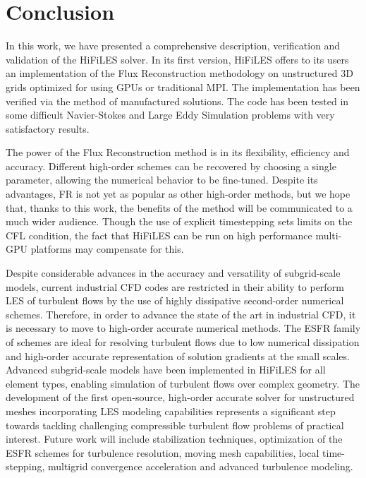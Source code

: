 
\section{Conclusion}
\label{sec:conclusion}

In this work, we have presented a comprehensive description, verification and validation of the HiFiLES solver. In its first version, HiFiLES offers to its users an implementation of the Flux Reconstruction methodology on unstructured 3D grids optimized for using GPUs or traditional MPI. The implementation has been verified via the method of manufactured solutions. The code has been tested in some difficult Navier-Stokes and Large Eddy Simulation problems with very satisfactory results.

The power of the Flux Reconstruction method is in its flexibility, efficiency and accuracy.
Different high-order schemes can be recovered by choosing a single parameter, allowing the numerical behavior to be fine-tuned.
Despite its advantages, FR is not yet as popular as other high-order methods, but we hope that, thanks to this work, the benefits of the method will be communicated to a much wider audience.
Though the use of explicit timestepping sets limits on the CFL condition, the fact that HiFiLES can be run on high performance multi-GPU platforms may compensate for this.


Despite considerable advances in the accuracy and versatility of subgrid-scale models, current industrial CFD codes are restricted in their ability to perform LES of turbulent flows by the use of highly dissipative second-order numerical schemes.
Therefore, in order to advance the state of the art in industrial CFD, it is necessary to move to high-order accurate numerical methods.
The ESFR family of schemes are ideal for resolving turbulent flows due to low numerical dissipation and high-order accurate representation of solution gradients at the small scales.
Advanced subgrid-scale models have been implemented in HiFiLES for all element types, enabling simulation of turbulent flows over complex geometry.
The development of the first open-source, high-order accurate solver for unstructured meshes incorporating LES modeling capabilities represents a significant step towards tackling challenging compressible turbulent flow problems of practical interest.
Future work will include stabilization techniques, optimization of the ESFR schemes for turbulence resolution, moving mesh capabilities, local time-stepping, multigrid convergence acceleration and advanced turbulence modeling.